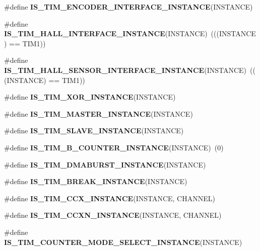 \begin{DoxyCompactItemize}
\item 
\#define {\bfseries I\+S\+\_\+\+T\+I\+M\+\_\+\+E\+N\+C\+O\+D\+E\+R\+\_\+\+I\+N\+T\+E\+R\+F\+A\+C\+E\+\_\+\+I\+N\+S\+T\+A\+N\+CE}(I\+N\+S\+T\+A\+N\+CE)
\item 
\mbox{\label{group___exported__macro_gacdcc047699e2d83c9d2b3a3f8375dff4}} 
\#define {\bfseries I\+S\+\_\+\+T\+I\+M\+\_\+\+H\+A\+L\+L\+\_\+\+I\+N\+T\+E\+R\+F\+A\+C\+E\+\_\+\+I\+N\+S\+T\+A\+N\+CE}(I\+N\+S\+T\+A\+N\+CE)~(((I\+N\+S\+T\+A\+N\+CE) == T\+I\+M1))
\item 
\mbox{\label{group___exported__macro_ga979ea18ba0931f5ed15cc2f3ac84794b}} 
\#define {\bfseries I\+S\+\_\+\+T\+I\+M\+\_\+\+H\+A\+L\+L\+\_\+\+S\+E\+N\+S\+O\+R\+\_\+\+I\+N\+T\+E\+R\+F\+A\+C\+E\+\_\+\+I\+N\+S\+T\+A\+N\+CE}(I\+N\+S\+T\+A\+N\+CE)~(((I\+N\+S\+T\+A\+N\+CE) == T\+I\+M1))
\item 
\#define {\bfseries I\+S\+\_\+\+T\+I\+M\+\_\+\+X\+O\+R\+\_\+\+I\+N\+S\+T\+A\+N\+CE}(I\+N\+S\+T\+A\+N\+CE)
\item 
\#define {\bfseries I\+S\+\_\+\+T\+I\+M\+\_\+\+M\+A\+S\+T\+E\+R\+\_\+\+I\+N\+S\+T\+A\+N\+CE}(I\+N\+S\+T\+A\+N\+CE)
\item 
\#define {\bfseries I\+S\+\_\+\+T\+I\+M\+\_\+\+S\+L\+A\+V\+E\+\_\+\+I\+N\+S\+T\+A\+N\+CE}(I\+N\+S\+T\+A\+N\+CE)
\item 
\mbox{\label{group___exported__macro_gac41867bf288927ff8ff10a85e67a591b}} 
\#define {\bfseries I\+S\+\_\+\+T\+I\+M\+\_\+B\+\_\+\+C\+O\+U\+N\+T\+E\+R\+\_\+\+I\+N\+S\+T\+A\+N\+CE}(I\+N\+S\+T\+A\+N\+CE)~(0)
\item 
\#define {\bfseries I\+S\+\_\+\+T\+I\+M\+\_\+\+D\+M\+A\+B\+U\+R\+S\+T\+\_\+\+I\+N\+S\+T\+A\+N\+CE}(I\+N\+S\+T\+A\+N\+CE)
\item 
\#define {\bfseries I\+S\+\_\+\+T\+I\+M\+\_\+\+B\+R\+E\+A\+K\+\_\+\+I\+N\+S\+T\+A\+N\+CE}(I\+N\+S\+T\+A\+N\+CE)
\item 
\#define {\bfseries I\+S\+\_\+\+T\+I\+M\+\_\+\+C\+C\+X\+\_\+\+I\+N\+S\+T\+A\+N\+CE}(I\+N\+S\+T\+A\+N\+CE,  C\+H\+A\+N\+N\+EL)
\item 
\#define {\bfseries I\+S\+\_\+\+T\+I\+M\+\_\+\+C\+C\+X\+N\+\_\+\+I\+N\+S\+T\+A\+N\+CE}(I\+N\+S\+T\+A\+N\+CE,  C\+H\+A\+N\+N\+EL)
\item 
\#define {\bfseries I\+S\+\_\+\+T\+I\+M\+\_\+\+C\+O\+U\+N\+T\+E\+R\+\_\+\+M\+O\+D\+E\+\_\+\+S\+E\+L\+E\+C\+T\+\_\+\+I\+N\+S\+T\+A\+N\+CE}(I\+N\+S\+T\+A\+N\+CE)

\end{DoxyCompactItemize}
